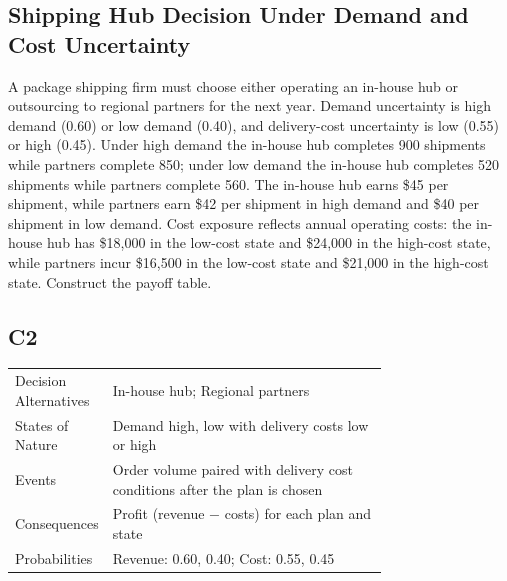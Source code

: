 \begin{ExamProblems}
		\item
		\subsection*{Shipping Hub Decision Under Demand and Cost Uncertainty}
		A package shipping firm must choose either operating an in-house hub or outsourcing to regional partners for the next year.
		Demand uncertainty is high demand (0.60) or low demand (0.40), and delivery-cost uncertainty is low (0.55) or high (0.45).
		Under high demand the in-house hub completes 900 shipments while partners complete 850; under low demand the in-house hub completes
		520 shipments while partners complete 560. The in-house hub earns \$45 per shipment, while partners earn \$42 per shipment in high demand
		and \$40 per shipment in low demand. Cost exposure reflects annual operating costs: the in-house hub has \$18{,}000 in the low-cost state
		and \$24{,}000 in the high-cost state, while partners incur \$16{,}500 in the low-cost state and \$21{,}000 in the high-cost state.
		Construct the payoff table.
		
		\subsection*{C2}
		\begin{center}
			\begin{tabular}{l p{0.74\linewidth}}
				\toprule
				Decision Alternatives & In-house hub; Regional partners \\
				States of Nature & Demand high, low with delivery costs low or high \\
				Events & Order volume paired with delivery cost conditions after the plan is chosen \\
				Consequences & Profit (revenue $-$ costs) for each plan and state \\
				Probabilities & Revenue: 0.60, 0.40; Cost: 0.55, 0.45 \\
				\bottomrule
			\end{tabular}
		\end{center}
		

\end{ExamProblems}
